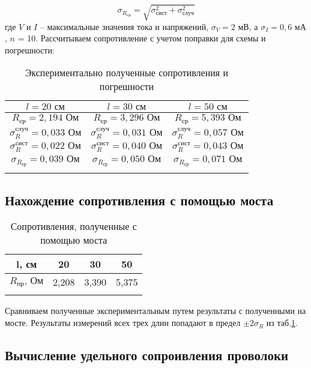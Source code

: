 \documentclass[a4paper, 12pt]{article}
\begin{document}
 
	\begin{equation}
		\sigma_{R_\text{ср}} = \sqrt{\sigma_{\text{сист}}^2 + \sigma_{\text{случ}}^2}
	\end{equation}
	\newpage
	\noindent где $V$ и $I$ -- максимальные значения тока и напряжений, $\sigma_V = 2 \text{ мВ}$, а $\sigma_I = 0,6 \text{ мА}$, $n$ = 10. Рассчитываем сопротивление с учетом поправки для схемы и погрешности:
	
	\begin{longtable}[H]{|c||c||c|}
		\hline
		$l = 20 \text{ см}$ & $l = 30 \text{ см}$ & $l = 50 \text{ см}$ \\
		\hline
		$R_\text{ср} = 2,194 \text{ Ом}$ & $R_\text{ср} = 3,296 \text{ Ом}$ & $R_\text{ср} = 5,393 \text{ Ом}$ \\
		\hline
		$\sigma_R^\text{случ} = 0,033\text{ Ом}$ & $\sigma_R^\text{случ} = 0,031\text{ Ом}$ & $\sigma_R^\text{случ} = 0,057\text{ Ом}$ \\
		\hline
		$\sigma_R^\text{сист} = 0,022 \text{ Ом}$ & $\sigma_R^\text{сист} = 0,040 \text{ Ом}$ & $\sigma_R^\text{сист} = 0,043 \text{ Ом}$ \\
		\hline
		$\sigma_{R_\text{ср}} = 0,039 \text{ Ом}$ & $\sigma_{R_\text{ср}} = 0,050 \text{ Ом}$ & $\sigma_{R_\text{ср}} = 0,071 \text{ Ом}$ \\
		\hline
		
		\caption{Экспериментально полученные сопротивления и погрешности}
		\label{R}
	\end{longtable}
	
	\subsection*{Нахождение сопротивления с помощью моста}
	
	\begin{longtable}[H]{|c|c|c|c|}
		\hline
		l, см & 20 & 30 & 50 \\
		\hline
		$R_\text{пр} \text{, Ом}$ & 2,208 & 3,390 & 5,375 \\
		\hline
		
		\caption{Сопротивления, полученные с помощью моста}
		\label{most}
	\end{longtable}
	
	Сравниваем полученные экспериментальным путем результаты с полученными на мосте. Результаты измерений всех трех длин попадают в предел $\pm2\sigma_R$ из таб.\ref{R}.
	
	\subsection*{Вычисление удельного сопроивления проволоки}
	
\end{document}
